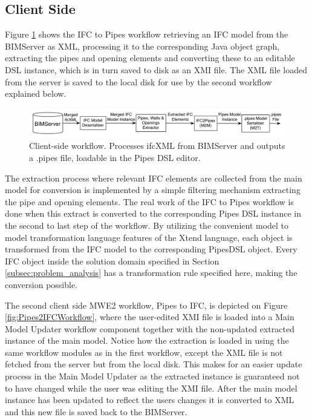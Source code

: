 \subsection{Client Side}
Figure \ref{fig:IFC2PipesWorkflow} shows the IFC to Pipes workflow retrieving an IFC model from the BIMServer as XML, processing it to the corresponding Java object graph, extracting the pipes and opening elements and converting these to an editable DSL instance, which is in turn saved to disk as an XMI file. The XML file loaded from the server is saved to the local disk for use by the second workflow explained below.

\begin{figure}[t]
    \centering
        \includegraphics[width=120mm]{images/IFC2Pipes.pdf}
    \caption{Client-side workflow. Processes ifcXML from BIMServer and outputs a .pipes file, loadable in the Pipes DSL editor.}
    \label{fig:IFC2PipesWorkflow}
\end{figure}

The extraction process where relevant IFC elements are collected from the main model for conversion is implemented by a simple filtering mechanism extracting the pipe and opening elements. The real work of the IFC to Pipes workflow is done when this extract is converted to the corresponding Pipes DSL instance in the second to last step of the workflow. By utilizing the convenient model to model transformation language features of the Xtend language, each object is transformed from the IFC model to the corresponding PipesDSL object. Every IFC object inside the solution domain specified in Section \ref{subsec:problem_analysis} has a transformation rule specified here, making the conversion possible.

The second client side MWE2 workflow, Pipes to IFC, is depicted on Figure \ref{fig:Pipes2IFCWorkflow}, where the user-edited XMI file is loaded into a Main Model Updater workflow component together with the non-updated extracted instance of the main model. Notice how the extraction is loaded in using the same workflow modules as in the first workflow, except the XML file is not fetched from the server but from the local disk. This makes for an easier update process in the Main Model Updater as the extracted instance is guaranteed not to have changed while the user was editing the XMI file. After the main model instance has been updated to reflect the users changes it is converted to XML and this new file is saved back to the BIMServer.

